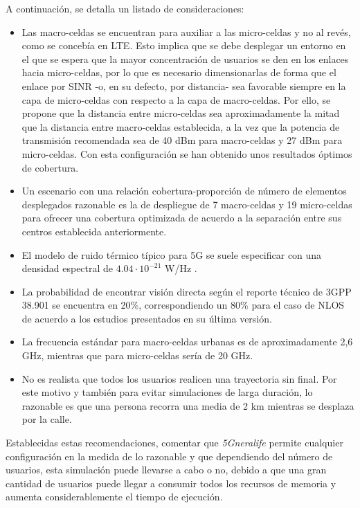 A continuación, se detalla un listado de consideraciones:
\begin{itemize}
    \item Las macro-celdas se encuentran para auxiliar a las micro-celdas y no al revés, como se concebía en LTE. Esto implica que se debe desplegar un entorno en el que se espera que la mayor concentración de usuarios se den en los enlaces hacia micro-celdas, por lo que es necesario dimensionarlas de forma que el enlace por SINR -o, en su defecto, por distancia- sea favorable siempre en la capa de micro-celdas con respecto a la capa de macro-celdas. Por ello, se propone que la distancia entre micro-celdas sea aproximadamente la mitad que la distancia entre macro-celdas establecida, a la vez que la potencia de transmisión recomendada sea de 40 dBm para macro-celdas y 27 dBm para micro-celdas. Con esta configuración se han obtenido unos resultados óptimos de cobertura.
    \item Un escenario con una relación cobertura-proporción de número de elementos desplegados razonable es la de despliegue de 7 macro-celdas y 19 micro-celdas para ofrecer una cobertura optimizada de acuerdo a la separación entre sus centros establecida anteriormente.
    \item El modelo de ruido térmico típico para 5G se suele especificar con una densidad espectral de $4.04·10^{-21}$ W/Hz \cite{ruido}.
    \item La probabilidad de encontrar visión directa según el reporte técnico de 3GPP 38.901 se encuentra en 20\%, correspondiendo un 80\% para el caso de NLOS de acuerdo a los estudios presentados en su última versión.
    \item La frecuencia estándar para macro-celdas urbanas es de aproximadamente 2,6 GHz, mientras que para micro-celdas sería de 20 GHz.
    \item No es realista que todos los usuarios realicen una trayectoria sin final. Por este motivo y también para evitar simulaciones de larga duración, lo razonable es que una persona recorra una media de 2 km mientras se desplaza por la calle.
\end{itemize}

Establecidas estas recomendaciones, comentar que \textit{5Gneralife} permite cualquier configuración en la medida de lo razonable y que dependiendo del número de usuarios, esta simulación puede llevarse a cabo o no, debido a que una gran cantidad de usuarios puede llegar a consumir todos los recursos de memoria y aumenta considerablemente el tiempo de ejecución.

